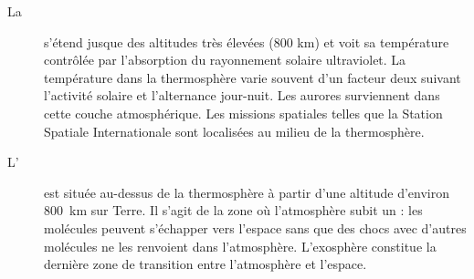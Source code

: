 \begin{description}
\item[La ] s'étend jusque des altitudes très élevées (800 km) et voit sa température contrôlée par l'absorption du rayonnement solaire ultraviolet. La température dans la thermosphère varie souvent d'un facteur deux suivant l'activité solaire et l'alternance jour-nuit. Les aurores surviennent dans cette couche atmosphérique. Les missions spatiales  telles que la Station Spatiale Internationale sont localisées au milieu de la thermosphère.
\item[L'] est située au-dessus de la thermosphère à partir d'une altitude d'environ~$800$~km sur Terre. Il s'agit de la zone où l'atmosphère subit un  : les molécules peuvent s'échapper vers l'espace sans que des chocs avec d'autres molécules ne les renvoient dans l'atmosphère. L'exosphère constitue la dernière zone de transition entre l'atmosphère et l'espace.
\end{description}


